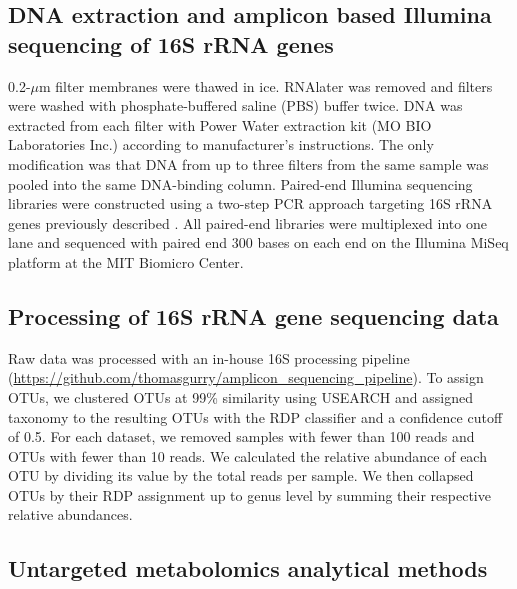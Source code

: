 \subsection{DNA extraction and amplicon based Illumina sequencing of 16S rRNA genes}

0.2-$\mu$m filter membranes were thawed in ice. RNAlater was removed and filters were washed with phosphate-buffered saline (PBS) buffer twice. DNA was extracted from each filter with Power Water extraction kit (MO BIO Laboratories Inc.) according to manufacturer's instructions. The only modification was that DNA from up to three filters from the same sample was pooled into the same DNA-binding column. Paired-end Illumina sequencing libraries were constructed using a two-step PCR approach targeting 16S rRNA genes previously described \cite{Preheim2013}. All paired-end libraries were multiplexed into one lane and sequenced with paired end 300 bases on each end on the Illumina MiSeq platform at the MIT Biomicro Center.

\subsection{Processing of 16S rRNA gene sequencing data}

Raw data was processed with an in-house 16S processing pipeline (\url{https://github.com/thomasgurry/amplicon_sequencing_pipeline}). To assign OTUs, we clustered OTUs at 99\% similarity using USEARCH \cite{edgar-usearch-2010} and assigned taxonomy to the resulting OTUs with the RDP classifier \cite{wang2007naive} and a confidence cutoff of 0.5. For each dataset, we removed samples with fewer than 100 reads and OTUs with fewer than 10 reads. We calculated the relative abundance of each OTU by dividing its value by the total reads per sample. We then collapsed OTUs by their RDP assignment up to genus level by summing their respective relative abundances.

\subsection{Untargeted metabolomics analytical methods}

